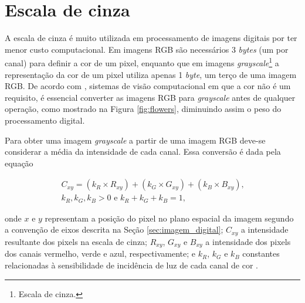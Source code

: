 
\section{Escala de cinza} %
\label{sec:escala_de_cinza}

A escala de cinza é muito utilizada em processamento de imagens digitais por ter menor custo computacional. Em imagens RGB são necessários 3 \textit{bytes} (um por canal) para definir a cor de um pixel, enquanto que em imagens \textit{grayscale}\footnote{Escala de cinza.} a representação da cor de um pixel utiliza apenas 1 \textit{byte}, um terço de uma imagem RGB. De acordo com \cite{woods:2000:book}, sistemas de visão computacional em que a cor não é um requisito, é essencial converter as imagens RGB para \textit{grayscale} antes de qualquer operação, como mostrado na Figura \ref{fig:flowers}, diminuindo assim o peso do processamento digital.

Para obter uma imagem \textit{grayscale} a partir de uma imagem RGB deve-se considerar a média da intensidade de cada canal. Essa conversão é dada pela equação 

\begin{gather}
\label{eq:conversao_cinza}
  C_{xy}=(k_{R}\times R_{xy})+(k_{G}\times G_{xy})+(k_{B}\times B_{xy})\text{,}\\
  \nonumber k_{R}, k_{G}, k_{B} > 0 \text{ e }  k_{R}+k_{G}+k_{B}=1\text{,}
\end{gather}

\noindent onde $x$ e $y$ representam a posição do pixel no plano espacial da imagem segundo a convenção de eixos descrita na Seção \ref{sec:imagem_digital}; $C_{xy}$ a intensidade resultante dos pixels na escala de cinza; $R_{xy}$, $G_{xy}$ e $B_{xy}$ a intensidade dos pixels dos canais vermelho, verde e azul, respectivamente; e $k_{R}$, $k_{G}$ e $k_{B}$ constantes relacionadas à sensibilidade de incidência de luz de cada canal de cor \citep{sjohnson:2006:book}.

